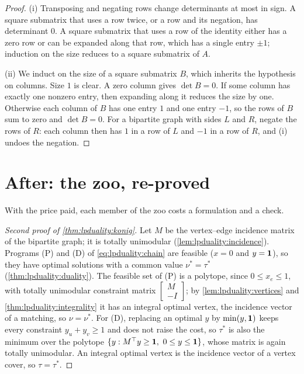 \begin{refsection}
\begin{proof}
(i) Transposing and negating rows change determinants at most in sign. A square submatrix that uses a row twice, or a row and its negation, has determinant $0$. A square submatrix that uses a row of the identity either has a zero row or can be expanded along that row, which has a single entry $\pm1$; induction on the size reduces to a square submatrix of $A$.

(ii) We induct on the size of a square submatrix $B$, which inherits the hypothesis on columns. Size $1$ is clear. A zero column gives $\det B=0$. If some column has exactly one nonzero entry, then expanding along it reduces the size by one. Otherwise each column of $B$ has one entry $1$ and one entry $-1$, so the rows of $B$ sum to zero and $\det B=0$. For a bipartite graph with sides $L$ and $R$, negate the rows of $R$: each column then has $1$ in a row of $L$ and $-1$ in a row of $R$, and (i) undoes the negation.
\end{proof}

\section{After: the zoo, re-proved}\label{sec:lpduality:zoo}

With the price paid, each member of the zoo costs a formulation and a check.

\begin{proof}[Second proof of \cref{thm:lpduality:konig}]
Let $M$ be the vertex--edge incidence matrix of the bipartite graph; it is totally unimodular (\cref{lem:lpduality:incidence}). Programs (P) and (D) of \eqref{eq:lpduality:chain} are feasible ($x=0$ and $y=\mathbf{1}$), so they have optimal solutions with a common value $\nu^*=\tau^*$ (\cref{thm:lpduality:duality}). The feasible set of (P) is a polytope, since $0\le x_e\le1$, with totally unimodular constraint matrix $\left[\begin{smallmatrix}M\\-I\end{smallmatrix}\right]$; by \cref{lem:lpduality:vertices} and \cref{thm:lpduality:integrality} it has an integral optimal vertex, the incidence vector of a matching, so $\nu=\nu^*$. For (D), replacing an optimal $y$ by $\min(y,\mathbf{1})$ keeps every constraint $y_u+y_v\ge1$ and does not raise the cost, so $\tau^*$ is also the minimum over the polytope $\{y:M^\top y\ge\mathbf{1},\ 0\le y\le\mathbf{1}\}$, whose matrix is again totally unimodular. An integral optimal vertex is the incidence vector of a vertex cover, so $\tau=\tau^*$.
\end{proof}


\end{refsection}
